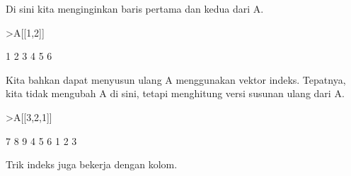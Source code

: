 \documentclass{article}
\begin{document}
\begin{eulernotebook}
\begin{eulercomment}
Di sini kita menginginkan baris pertama dan kedua dari A.
\end{eulercomment}
\begin{eulerprompt}
>A[[1,2]]
\end{eulerprompt}
\begin{euleroutput}
              1             2             3 
              4             5             6 
\end{euleroutput}
\begin{eulercomment}
Kita bahkan dapat menyusun ulang A menggunakan vektor indeks.
Tepatnya, kita tidak mengubah A di sini, tetapi menghitung versi
susunan ulang dari A.
\end{eulercomment}
\begin{eulerprompt}
>A[[3,2,1]]
\end{eulerprompt}
\begin{euleroutput}
              7             8             9 
              4             5             6 
              1             2             3 
\end{euleroutput}
\begin{eulercomment}
Trik indeks juga bekerja dengan kolom.



\end{eulercomment}
\end{eulernotebook}
\end{document}
